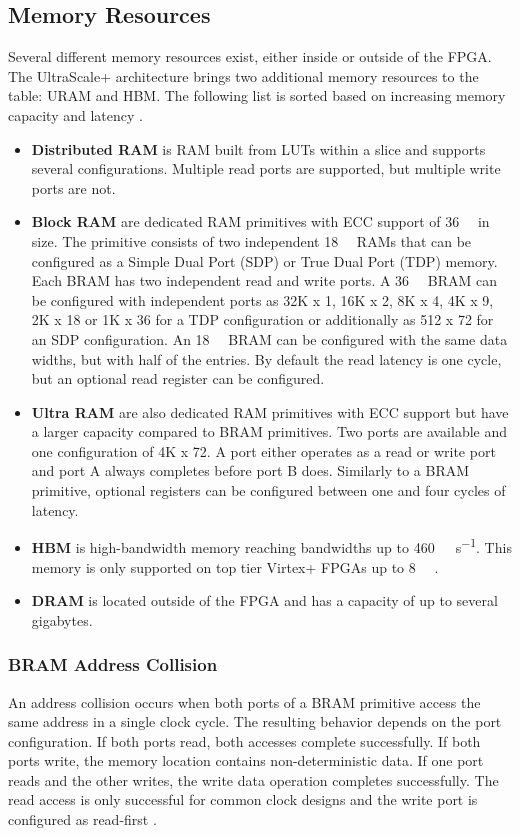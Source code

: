 \subsection{Memory Resources}
Several different memory resources exist, either inside or outside of the FPGA. The UltraScale+ architecture brings two additional memory resources to the table: URAM and HBM. The following list is sorted based on increasing memory capacity and latency \cite{xilinx-ug573}.
\begin{itemize}
  \item{\textbf{Distributed RAM} is RAM built from LUTs within a slice and supports several configurations. Multiple read ports are supported, but multiple write ports are not.}
  \item{\textbf{Block RAM} are dedicated RAM primitives with ECC support of \SI{36}{\kilo\bit} in size. The primitive consists of two independent \SI{18}{\kilo\bit} RAMs that can be configured as a Simple Dual Port (SDP) or True Dual Port (TDP) memory. Each BRAM has two independent read and write ports. A \SI{36}{\kilo\bit} BRAM can be configured with independent ports as 32K x 1, 16K x 2, 8K x 4, 4K x 9, 2K x 18 or 1K x 36 for a TDP configuration or additionally as 512 x 72 for an SDP configuration. An \SI{18}{\kilo\bit} BRAM can be configured with the same data widths, but with half of the entries. By default the read latency is one cycle, but an optional read register can be configured.}
  \item{\textbf{Ultra RAM} are also dedicated RAM primitives with ECC support but have a larger capacity compared to BRAM primitives. Two ports are available and one configuration of 4K x 72. A port either operates as a read or write port and port A always completes before port B does. Similarly to a BRAM primitive, optional registers can be configured between one and four cycles of latency.}
  \item{\textbf{HBM} is high-bandwidth memory reaching bandwidths up to \SI{460}{\giga\byte\per\second}. This memory is only supported on top tier Virtex+ FPGAs up to \SI{8}{\giga\byte} \cite{xilinx-hbm}.}
  \item{\textbf{DRAM} is located outside of the FPGA and has a capacity of up to several gigabytes.}
\end{itemize}




\subsubsection{BRAM Address Collision}
An address collision occurs when both ports of a BRAM primitive access the same address in a single clock cycle. The resulting behavior depends on the port configuration. If both ports read, both accesses complete successfully. If both ports write, the memory location contains non-deterministic data. If one port reads and the other writes, the write data operation completes successfully. The read access is only successful for common clock designs and the write port is configured as read-first \cite{xilinx-ug573}.



